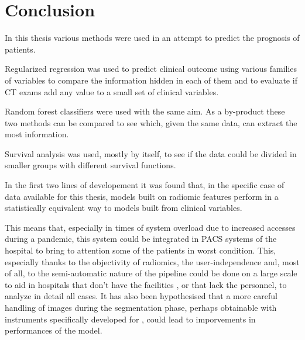 \chapter{Conclusion}

In this thesis various methods were used in an attempt to predict the prognosis of \covid patients. 

Regularized regression was used to predict clinical outcome using various families of variables to compare the information hidden in each of them and to evaluate if CT exams add any value to a small set of clinical variables.

Random forest classifiers were used with the same aim. As a by-product these two methods can be compared to see which, given the same data, can extract the most information.

Survival analysis was used, mostly by itself, to see if the data could be divided in smaller groups with different survival functions.

In the first two lines of developement it was found that, in the specific case of data available for this thesis, models built on radiomic features perform in a statistically equivalent way to models built from clinical variables.

This means that, especially in times of system overload due to increased accesses during a pandemic, this system could be integrated in PACS systems of the hospital to bring to attention some of the patients in worst condition.
This, especially thanks to the objectivity of radiomics, the user-independence and, most of all, to the semi-automatic nature of the pipeline could be done on a large scale to aid in hospitals that don't have the facilities , or that lack the personnel, to analyze in detail all cases.
It has also been hypothesised that a more careful handling of images during the segmentation phase, perhaps obtainable with instruments specifically developed for \covid, could lead to imporvements in performances of the model.

